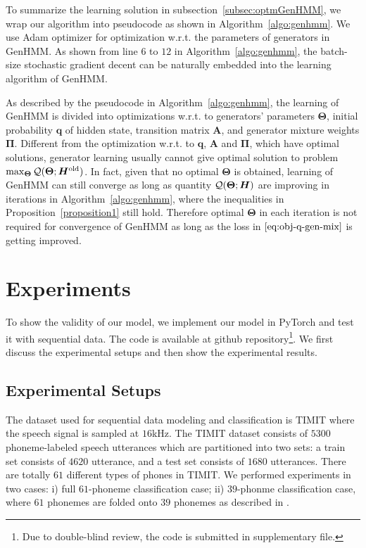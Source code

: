 \documentclass{ecai}
\begin{document}
To summarize the learning solution in subsection~\ref{subsec:optmGenHMM}, we wrap our algorithm into pseudocode as shown in Algorithm~\ref{algo:genhmm}. We use Adam \cite{DBLP:journals/corr/KingmaB14} optimizer for optimization w.r.t. the parameters of generators in GenHMM. As shown from line $6$ to $12$ in Algorithm~\ref{algo:genhmm}, the batch-size stochastic gradient decent can be naturally embedded into the learning algorithm of GenHMM.

As described by the pseudocode in Algorithm~\ref{algo:genhmm}, the learning of GenHMM is divided into optimizations w.r.t. to generators' parameters $\bm{\Theta}$, initial probability $\bm{q}$ of hidden state, transition matrix $\bm{A}$, and generator mixture weights $\bm{\Pi}$. Different from the optimization w.r.t. to $\bm{q}$, $\bm{A}$ and $\bm{\Pi}$, which have optimal solutions, generator learning usually cannot give optimal solution to problem $\max_{\bm{\Theta}} \mathcal{Q}(\bm{\Theta}; \bm{H}^{\mathrm{old}})$. In fact, given that no optimal $\bm{\Theta}$ is obtained, learning of GenHMM can still converge as long as quantity $\mathcal{Q}(\bm{\Theta}; \bm{H})$ are improving in iterations in Algorithm~\ref{algo:genhmm}, where the inequalities in Proposition~\ref{proposition1} still hold. Therefore optimal $\bm{\Theta}$ in each iteration is not required for convergence of GenHMM as long as the loss in $\eqref{eq:obj-q-gen-mix}$ is getting improved.




\section{Experiments}
To show the validity of our model, we implement our model in PyTorch and test it with sequential data. The code is available at github repository\footnote{Due to double-blind review, the code is submitted in supplementary file.}. We first discuss the experimental setups and then show the experimental results.

\subsection{Experimental Setups}
The dataset used for sequential data modeling and classification is TIMIT where the speech signal is sampled at $16$kHz.
The TIMIT dataset consists of $5300$ phoneme-labeled speech utterances which are partitioned into two sets: {a train set consists of $4620$ utterance, and a test set consists of $1680$ utterances.} There are totally $61$ different types of phones in TIMIT.
We performed experiments in two cases: i) full $61$-phoneme classification case; ii) $39$-phonme classification case, where $61$ phonemes are folded onto $39$ phonemes as described in \cite{Perdigao11}.
\end{document}
